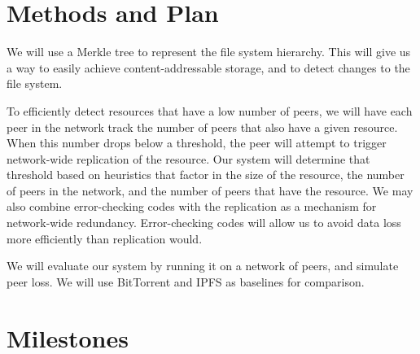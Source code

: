 \documentclass[twocolumn]{article}
\begin{document}
\section{Methods and Plan}


We will use a Merkle tree to represent the file system hierarchy.
This will give us a way to easily achieve content-addressable storage, and to detect changes to the file system.

To efficiently detect resources that have a low number of peers, we will have each peer in the network track the number of peers that also have a given resource.
When this number drops below a threshold, the peer will attempt to trigger network-wide replication of the resource.
Our system will determine that threshold based on heuristics that factor in the size of the resource, the number of peers in the network, and the number of peers that have the resource.
We may also combine error-checking codes with the replication as a mechanism for network-wide redundancy.
Error-checking codes will allow us to avoid data loss more efficiently than replication would.

We will evaluate our system by running it on a network of peers, and simulate peer loss.
We will use BitTorrent and IPFS as baselines for comparison.

\section{Milestones}


\lipsum[4]
\end{document}
